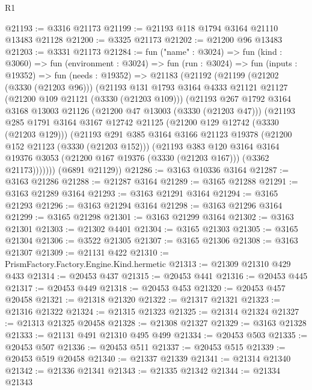 \begin{lexlean}{R1}
\begin{coremodule}
@21193 := @3316 @21173
@21199 := @21193 @118 @1794 @3164 @21110 @13483 @21128
@21200 := @3325 @21173
@21202 := @21200 @96 @13483
@21203 := @3331 @21173
@21284 := fun ("name" : @3024) =>
  fun (kind : @3060) =>
  fun (environment : @3024) =>
  fun (run : @3024) =>
  fun (inputs : @19352) =>
  fun (needs : @19352) =>
  @21183
    (@21192
      (@21199
        (@21202 (@3330 (@21203 @96)))
        (@21193
          @131
          @1793
          @3164
          @4333
          @21121
          @21127
          (@21200 @109 @21121 (@3330 (@21203 @109)))
          (@21193
            @267
            @1792
            @3164
            @3168
            @13003
            @21126
            (@21200 @47 @13003 (@3330 (@21203 @47)))
            (@21193
              @285
              @1791
              @3164
              @3167
              @12742
              @21125
              (@21200 @129 @12742 (@3330 (@21203 @129)))
              (@21193
                @291
                @385
                @3164
                @3166
                @21123
                @19378
                (@21200 @152 @21123 (@3330 (@21203 @152)))
                (@21193
                  @383
                  @120
                  @3164
                  @3164
                  @19376
                  @3053
                  (@21200 @167 @19376 (@3330 (@21203 @167)))
                  (@3362 @21173)))))))
      (@6891 @21129))
@21286 := @3163 @10336 @3164
@21287 := @3163 @21286
@21288 := @21287 @3164
@21289 := @3165 @21288
@21291 := @3163 @21289 @3164
@21293 := @3163 @21291 @3164
@21294 := @3165 @21293
@21296 := @3163 @21294 @3164
@21298 := @3163 @21296 @3164
@21299 := @3165 @21298
@21301 := @3163 @21299 @3164
@21302 := @3163 @21301
@21303 := @21302 @4401
@21304 := @3165 @21303
@21305 := @3165 @21304
@21306 := @3522 @21305
@21307 := @3165 @21306
@21308 := @3163 @21307
@21309 := @21131 @422
@21310 := PrismFactory.Factory.Engine.Kind.hermetic
@21313 := @21309 @21310 @429 @433
@21314 := @20453 @437
@21315 := @20453 @441
@21316 := @20453 @445
@21317 := @20453 @449
@21318 := @20453 @453
@21320 := @20453 @457 @20458
@21321 := @21318 @21320
@21322 := @21317 @21321
@21323 := @21316 @21322
@21324 := @21315 @21323
@21325 := @21314 @21324
@21327 := @21313 @21325 @20458
@21328 := @21308 @21327
@21329 := @3163 @21328
@21333 := @21131 @491 @21310 @495 @499
@21334 := @20453 @503
@21335 := @20453 @507
@21336 := @20453 @511
@21337 := @20453 @515
@21339 := @20453 @519 @20458
@21340 := @21337 @21339
@21341 := @21314 @21340
@21342 := @21336 @21341
@21343 := @21335 @21342
@21344 := @21334 @21343

\end{coremodule}
\end{lexlean}
